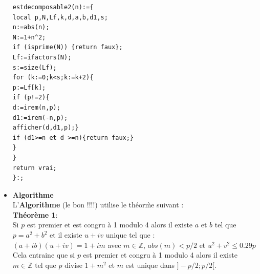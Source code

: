 \documentclass[a4paper,11pt]{book}
\newcommand{\Z}{{\mathbb{Z}}}
\begin{document}
\begin{itemize}
\begin{verbatim}
estdecomposable2(n):={
local p,N,Lf,k,d,a,b,d1,s;
n:=abs(n);
N:=1+n^2;
if (isprime(N)) {return faux};
Lf:=ifactors(N);
s:=size(Lf);
for (k:=0;k<s;k:=k+2){
p:=Lf[k];
if (p!=2){
d:=irem(n,p);
d1:=irem(-n,p);
afficher(d,d1,p);}
if (d1>=n et d >=n){return faux;}
}
}
return vrai;
}:;
\end{verbatim} 
\item {\bf Algorithme}\\
L'{\bf Algorithme} (le bon !!!!) utilise le th\'eor\`me suivant :\\
{\bf Th\'eor\`eme 1}:\\
Si $p$ est premier et est congru \`a 1 modulo 4 alors il existe $a$ et $b$ tel 
que $p=a^2+b^2$ et il existe $u+iv$ unique tel que :\\
$(a+ib)(u+iv)=1+im$ avec $m\in \Z$, $abs(m)<p/2$ et $u^2+v^2\leq 0.29p$\\
Cela entraine que si $p$ est premier et congru \`a 1 modulo 4 alors il existe 
$m \in \Z$ tel que $p$ divise $1+m^2$ et $m$ est unique dans $]-p/2;p/2[$.\\


\end{itemize}
\end{document}
